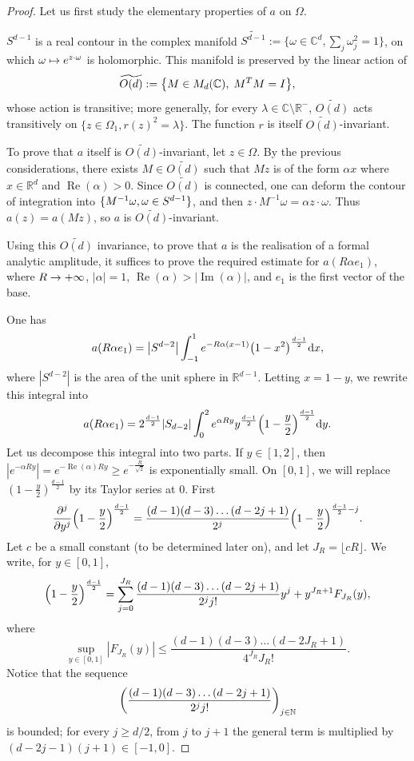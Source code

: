 \documentclass[AHL,Unicode,longabstracts,published]{cedram}
\DeclareMathOperator{\re}{Re}
\DeclareMathOperator{\im}{Im}
\newcommand\1{\mathds{1}}
\newcommand{\R}{\mathbb{R}}
\newcommand{\C}{\mathbb{C}}
\newcommand{\N}{\mathbb{N}}
\newcommand{\dd}{\mathrm{d}}
\renewcommand*{\to}{\mathchoice{\longrightarrow}{\rightarrow}{\rightarrow}{\rightarrow}}
\let\oldmapsto\mapsto
\renewcommand*{\mapsto}{\mathchoice{\longmapsto}{\oldmapsto}{\oldmapsto}{\oldmapsto}}
\let\originalleft\left
\let\originalright\right
\renewcommand{\left}{\mathopen{}\mathclose\bgroup\originalleft}
\renewcommand{\right}{\aftergroup\egroup\originalright}
\begin{document}
\begin{proof}
Let us first study the elementary properties of $a$ on $\Omega$.

$S^{d-1}$ is a real contour in the complex manifold $\widetilde{S^{d-1}}:=\{\omega\in \C^d,
\sum_j \omega_j^2=1\}$, on which $\omega\mapsto e^{z\cdot \omega}$ is holomorphic. This manifold is preserved by the linear action of
\[
\widetilde{O(d)}:=\left\{M\in M_d(\C),\; M^TM=I\right\},
\]
whose action is transitive; more generally, for every $\lambda\in
\C\setminus \R^-$, $\widetilde{O(d)}$ acts transitively on $\{z\in \Omega_1, r(z)^2=\lambda\}$. The function $r$ is itself $\widetilde{O(d)}$-invariant.


To prove that $a$ itself is $\widetilde{O(d)}$-invariant, let $z\in \Omega$. By the previous considerations, there exists $M\in \widetilde{O(d)}$ such that $Mz$ is of the form $\alpha x$ where $x\in \R^{d}$ and $\re(\alpha)>0$. Since $\widetilde{O(d)}$ is connected, one can deform the contour of integration into $\{M^{-1}\omega,\linebreak \omega\in S^{d-1}\}$, and then $z\cdot M^{-1}\omega=\alpha z\cdot \omega$. Thus $a(z)=a(Mz)$, so $a$ is $\widetilde{O(d)}$-invariant.

Using this $\widetilde{O(d)}$ invariance, to prove that $a$ is the realisation of a formal analytic amplitude, it suffices to prove the required estimate for $a(R\alpha e_1)$, where $R\to +\infty$, $|\alpha|=1$, $\re(\alpha)>\lvert\im(\alpha)|$, and $e_1$ is the first vector of the base.

One has
\[
a(R\alpha e_1)=\left|S^{d-2}\right|\int_{-1}^1 e^{-R\alpha (x-1)}\left(1-x^2\right)^{\frac{d-1}{2}}\dd x,
\]
where $|S^{d-2}|$ is the area of the unit sphere in $\R^{d-1}$. Letting $x=1-y$, we rewrite this integral into
\[
a(R\alpha e_1)=2^{\frac{d-1}{2}}|S_{d-2}|\int_{0}^{2} e^{\alpha R y}y^{\frac{d-1}{2}}\left(1-\frac{y}{2}\right)^{\frac{d-1}{2}}\dd y.
\]
Let us decompose this integral into two parts. If $y\in [1,2]$, then $|e^{-\alpha Ry}|=e^{-\re(\alpha)Ry}\geq e^{-\frac{R}{\sqrt{2}}}$ is exponentially small. On $[0,1]$, we will replace $(1-\frac{y}{2})^{\frac{d-1}{2}}$ by its Taylor series at $0$. First
\[
\frac{\partial^j}{\partial y^j}\left(1-\frac{y}{2}\right)^{\frac{d-1}{2}}=\frac{(d-1)(d-3)\dots(d-2j+1)}{2^j}\left(1-\frac{y}{2}\right)^{\frac{d-1}{2}-j}.
\]
Let $c$ be a small constant (to be determined later on), and let $J_R=\lfloor cR\rfloor$. We write, for $y\in [0,1]$,
\[
\left(1-\frac{y}{2}\right)^{\frac{d-1}{2}}=\sum_{j=0}^{J_R}\frac{(d-1)(d-3)\dots(d-2j+1)}{2^jj!}y^j+y^{J_R+1}F_{J_R}(y),
\]
where
\[
\sup_{y\in [0,1]}|F_{J_R}(y)|\leq
\frac{(d-1)(d-3)\dots(d-2J_R+1)}{4^{J_R}J_R!}.
\]
Notice that the sequence
\[
\left(\frac{(d-1)(d-3)\dots(d-2j+1)}{2^jj!}\right)_{j\in \N}
\]
is bounded; for every $j\geq d/2$, from $j$ to $j+1$ the general term is multiplied by $(d-2j-1)(j+1)\in [-1,0]$.


\end{proof}
\end{document}
